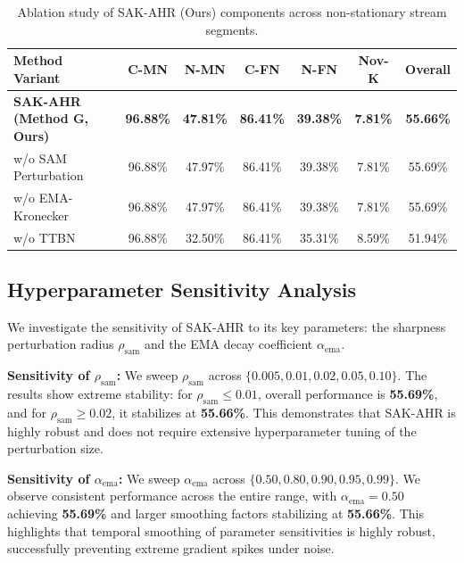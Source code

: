 \documentclass{article}
\theoremstyle{plain}
\theoremstyle{definition}
\theoremstyle{remark}
\begin{document}
\begin{table}[t]
\caption{Ablation study of SAK-AHR (Ours) components across non-stationary stream segments.}
\label{tab:ablation}
\vskip 0.15in
\begin{center}
\begin{small}
\begin{tabular}{lcccccc}
\toprule
Method Variant & C-MN & N-MN & C-FN & N-FN & Nov-K & Overall \\
\midrule
\textbf{SAK-AHR (Method G, Ours)} & \textbf{96.88\%} & \textbf{47.81\%} & \textbf{86.41\%} & \textbf{39.38\%} & \textbf{7.81\%} & \textbf{55.66\%} \\
w/o SAM Perturbation & 96.88\% & 47.97\% & 86.41\% & 39.38\% & 7.81\% & 55.69\% \\
w/o EMA-Kronecker & 96.88\% & 47.97\% & 86.41\% & 39.38\% & 7.81\% & 55.69\% \\
w/o TTBN & 96.88\% & 32.50\% & 86.41\% & 35.31\% & 8.59\% & 51.94\% \\
\bottomrule
\end{tabular}
\end{small}
\end{center}
\vskip -0.1in
\end{table}

\subsection{Hyperparameter Sensitivity Analysis}
We investigate the sensitivity of SAK-AHR to its key parameters: the sharpness perturbation radius $\rho_{\text{sam}}$ and the EMA decay coefficient $\alpha_{\text{ema}}$. 

\textbf{Sensitivity of $\rho_{\text{sam}}$:} We sweep $\rho_{\text{sam}}$ across $\{0.005, 0.01, 0.02, 0.05, 0.10\}$. The results show extreme stability: for $\rho_{\text{sam}} \le 0.01$, overall performance is \textbf{55.69\%}, and for $\rho_{\text{sam}} \ge 0.02$, it stabilizes at \textbf{55.66\%}. This demonstrates that SAK-AHR is highly robust and does not require extensive hyperparameter tuning of the perturbation size.

\textbf{Sensitivity of $\alpha_{\text{ema}}$:} We sweep $\alpha_{\text{ema}}$ across $\{0.50, 0.80, 0.90, 0.95, 0.99\}$. We observe consistent performance across the entire range, with $\alpha_{\text{ema}} = 0.50$ achieving \textbf{55.69\%} and larger smoothing factors stabilizing at \textbf{55.66\%}. This highlights that temporal smoothing of parameter sensitivities is highly robust, successfully preventing extreme gradient spikes under noise.
\end{document}
